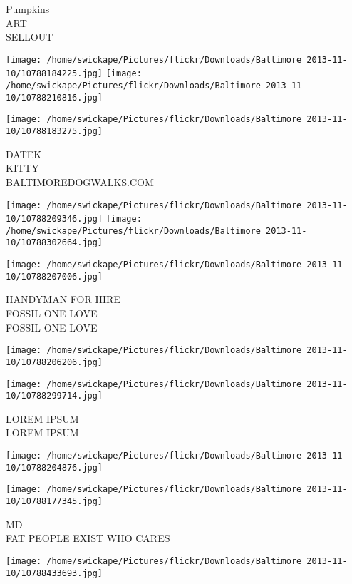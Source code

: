 \documentclass[10pt,letterpaper]{article}
\begin{document}
Pumpkins\\
ART\\
SELLOUT\\
\pagebreak

\texttt{[image: /home/swickape/Pictures/flickr/Downloads/Baltimore 2013-11-10/10788184225.jpg]}
\texttt{[image: /home/swickape/Pictures/flickr/Downloads/Baltimore 2013-11-10/10788210816.jpg]}

\vspace{0.25in}
\texttt{[image: /home/swickape/Pictures/flickr/Downloads/Baltimore 2013-11-10/10788183275.jpg]}

DATEK\\
KITTY\\
BALTIMOREDOGWALKS.COM\\
\pagebreak

\texttt{[image: /home/swickape/Pictures/flickr/Downloads/Baltimore 2013-11-10/10788209346.jpg]}
\texttt{[image: /home/swickape/Pictures/flickr/Downloads/Baltimore 2013-11-10/10788302664.jpg]}

\texttt{[image: /home/swickape/Pictures/flickr/Downloads/Baltimore 2013-11-10/10788207006.jpg]}

HANDYMAN FOR HIRE\\
FOSSIL ONE LOVE\\
FOSSIL ONE LOVE\\
\pagebreak

\texttt{[image: /home/swickape/Pictures/flickr/Downloads/Baltimore 2013-11-10/10788206206.jpg]}

\vspace{0.25in}
\texttt{[image: /home/swickape/Pictures/flickr/Downloads/Baltimore 2013-11-10/10788299714.jpg]}

LOREM IPSUM\\
LOREM IPSUM\\
\pagebreak

\texttt{[image: /home/swickape/Pictures/flickr/Downloads/Baltimore 2013-11-10/10788204876.jpg]}

\vspace{0.25in}
\texttt{[image: /home/swickape/Pictures/flickr/Downloads/Baltimore 2013-11-10/10788177345.jpg]}

MD\\
FAT PEOPLE EXIST WHO CARES\\
\pagebreak

\texttt{[image: /home/swickape/Pictures/flickr/Downloads/Baltimore 2013-11-10/10788433693.jpg]}
\end{document}
